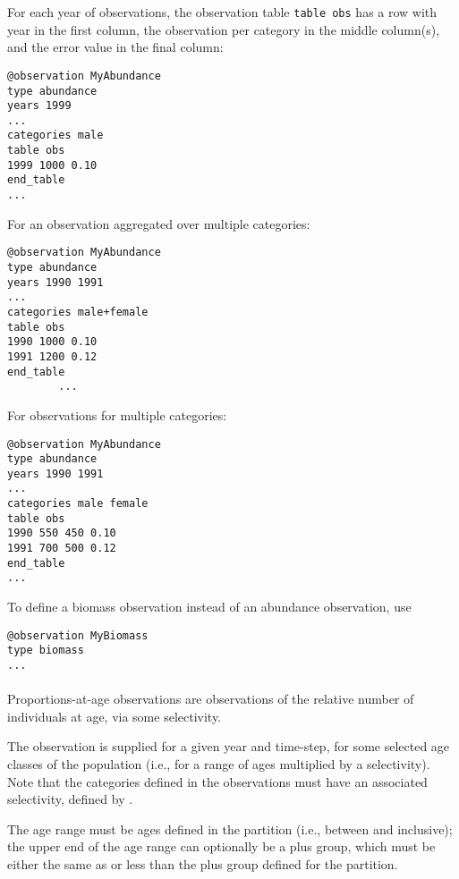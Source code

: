 For each year of observations, the observation table \texttt{table obs} has a row with year in the first column, the observation per category in the middle column(s), and the error value in the final column:

{\small{\begin{verbatim}
@observation MyAbundance
type abundance
years 1999
...
categories male
table obs
1999 1000 0.10
end_table
...
\end{verbatim}}}

For an observation aggregated over multiple categories:

{\small{\begin{verbatim}
@observation MyAbundance
type abundance
years 1990 1991
...
categories male+female
table obs
1990 1000 0.10
1991 1200 0.12
end_table
		...
\end{verbatim}}}

For observations for multiple categories:

{\small{\begin{verbatim}
@observation MyAbundance
type abundance
years 1990 1991
...
categories male female
table obs
1990 550 450 0.10
1991 700 500 0.12
end_table
...
\end{verbatim}}}

To define a biomass observation instead of an abundance observation, use

{\small{\begin{verbatim}
@observation MyBiomass
type biomass
...
\end{verbatim}}}

\ifAgeBased
\paragraph*{}\label{sec:Observation-ProportionsAtAge}

Proportions-at-age observations are observations of the relative number of individuals at age, via some selectivity.

The observation is supplied for a given year and time-step, for some selected age classes of the population (i.e., for a range of ages multiplied by a selectivity). Note that the categories defined in the observations must have an associated selectivity, defined by .

The age range must be ages defined in the partition (i.e., between  and  inclusive); the upper end of the age range can optionally be a plus group, which must be either the same as or less than the plus group defined for the partition.

